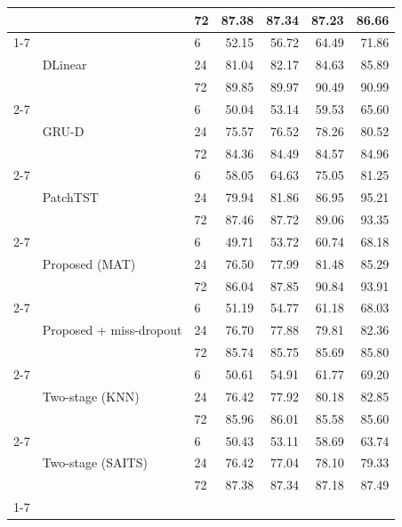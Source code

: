 \begin{table}
\begin{tabular}{lllrrrr}
 &  & 72 & 87.38 & 87.34 & 87.23 & 86.66 \\
\cline{1-7} \cline{2-7}
\multirow[t]{21}{*}{out} & \multirow[t]{3}{*}{DLinear} & 6 & 52.15 & 56.72 & 64.49 & 71.86 \\
 &  & 24 & 81.04 & 82.17 & 84.63 & 85.89 \\
 &  & 72 & 89.85 & 89.97 & 90.49 & 90.99 \\
\cline{2-7}
 & \multirow[t]{3}{*}{GRU-D} & 6 & 50.04 & 53.14 & 59.53 & 65.60 \\
 &  & 24 & 75.57 & 76.52 & 78.26 & 80.52 \\
 &  & 72 & 84.36 & 84.49 & 84.57 & 84.96 \\
\cline{2-7}
 & \multirow[t]{3}{*}{PatchTST} & 6 & 58.05 & 64.63 & 75.05 & 81.25 \\
 &  & 24 & 79.94 & 81.86 & 86.95 & 95.21 \\
 &  & 72 & 87.46 & 87.72 & 89.06 & 93.35 \\
\cline{2-7}
 & \multirow[t]{3}{*}{Proposed (MAT)} & 6 & 49.71 & 53.72 & 60.74 & 68.18 \\
 &  & 24 & 76.50 & 77.99 & 81.48 & 85.29 \\
 &  & 72 & 86.04 & 87.85 & 90.84 & 93.91 \\
\cline{2-7}
 & \multirow[t]{3}{*}{Proposed + miss-dropout} & 6 & 51.19 & 54.77 & 61.18 & 68.03 \\
 &  & 24 & 76.70 & 77.88 & 79.81 & 82.36 \\
 &  & 72 & 85.74 & 85.75 & 85.69 & 85.80 \\
\cline{2-7}
 & \multirow[t]{3}{*}{Two-stage (KNN)} & 6 & 50.61 & 54.91 & 61.77 & 69.20 \\
 &  & 24 & 76.42 & 77.92 & 80.18 & 82.85 \\
 &  & 72 & 85.96 & 86.01 & 85.58 & 85.60 \\
\cline{2-7}
 & \multirow[t]{3}{*}{Two-stage (SAITS)} & 6 & 50.43 & 53.11 & 58.69 & 63.74 \\
 &  & 24 & 76.42 & 77.04 & 78.10 & 79.33 \\
 &  & 72 & 87.38 & 87.34 & 87.18 & 87.49 \\
\cline{1-7} \cline{2-7}
\bottomrule
\end{tabular}
\end{table}
